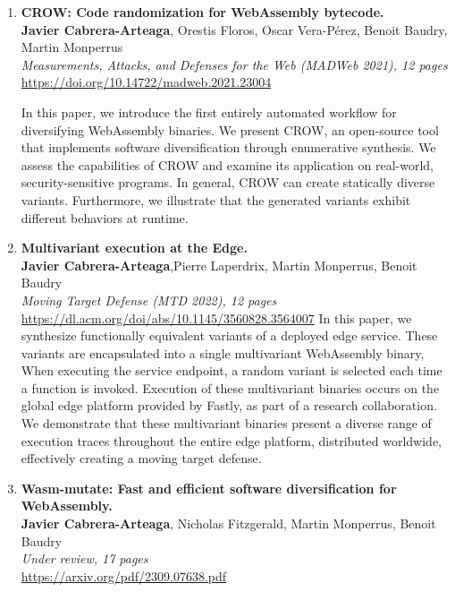 \begin{enumerate}[label={\textbf{P\arabic*}:}, ref={P\arabic*}]
	\item \label{crowpaper} \textbf{CROW: Code randomization for WebAssembly bytecode.} \\ 
	\textbf{Javier Cabrera-Arteaga}, Orestis Floros, Oscar Vera-Pérez, Benoit Baudry, Martin Monperrus\\
	\textit{ Measurements, Attacks, and Defenses for the Web (MADWeb 2021), 12 pages} \\
	\url{https://doi.org/10.14722/madweb.2021.23004}
	
	 In this paper, we introduce the first entirely automated workflow for diversifying WebAssembly binaries. 
	We present CROW, an open-source tool that implements software diversification through enumerative synthesis. 
	We assess the capabilities of CROW and examine its application on real-world, security-sensitive programs.
	In general, CROW can create statically diverse variants. 
	Furthermore, we illustrate that the generated variants exhibit different behaviors at runtime.

	
	
	\item \label{mewepaper} \textbf{Multivariant execution at the Edge. } \\
	\textbf{Javier Cabrera-Arteaga},Pierre Laperdrix, Martin Monperrus, Benoit Baudry\\
    \textit{Moving Target Defense (MTD 2022), 12 pages} \\
    \url{https://dl.acm.org/doi/abs/10.1145/3560828.3564007} 
	In this paper, we synthesize functionally equivalent variants of a deployed edge service. 
	These variants are encapsulated into a single multivariant WebAssembly binary, 
	When executing the service endpoint, a random variant is selected each time a function is invoked.
	Execution of these multivariant binaries occurs on the global edge platform provided by Fastly, as part of a research collaboration. 
	We demonstrate that these multivariant binaries present a diverse range of execution traces throughout the entire edge platform, distributed worldwide, effectively creating a moving target defense.

	
	\item \label{wasmmutatepaper}\textbf{Wasm-mutate: Fast and efficient software diversification for WebAssembly. }\\ 
	\textbf{Javier Cabrera-Arteaga}, Nicholas Fitzgerald, Martin Monperrus, Benoit Baudry\\
	\textit{Under review, 17 pages} \\
	\url{https://arxiv.org/pdf/2309.07638.pdf}    


\end{enumerate}
